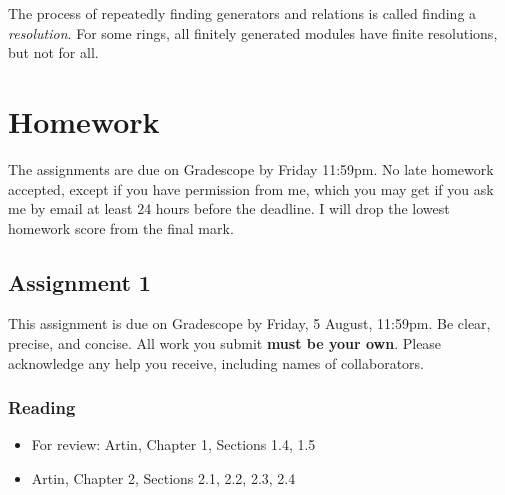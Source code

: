 \documentclass[11pt]{article}
\begin{document}
The process of repeatedly finding generators and relations is called finding a \emph{resolution}.
For some rings, all finitely generated modules have finite resolutions, but not for all.

\section{Homework}
\label{sec:org7e70dbc}
The assignments are due on Gradescope by Friday 11:59pm. No late homework accepted, except if you have permission from me, which you may get if you ask me by email at least 24 hours before the deadline. I will drop the lowest homework score from the final mark.
\subsection{Assignment 1}
\label{sec:org5bb816e}
This assignment is due on Gradescope by Friday, 5 August, 11:59pm.
Be clear, precise, and concise.  All work you submit \textbf{must be your own}.  Please acknowledge any help you receive, including names of collaborators.

\subsubsection*{Reading}
\label{sec:org6ceb3d2}
\begin{itemize}
\item For review: Artin, Chapter 1, Sections 1.4, 1.5
\item Artin, Chapter 2, Sections 2.1, 2.2, 2.3, 2.4
\end{itemize}
\end{document}
